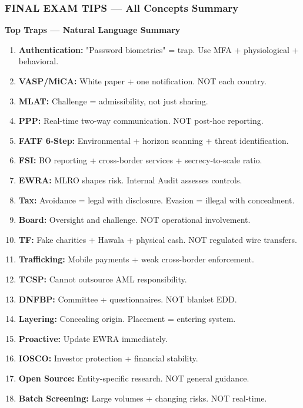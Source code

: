 \documentclass[12pt,aspectratio=169]{beamer}
\renewcommand{\scriptsize}{\fontsize{4.5}{5.5}\selectfont}
\begin{document}
	\begin{frame}
		\frametitle{\fontsize{11}{13}\selectfont \textbf{FINAL EXAM TIPS — All Concepts Summary}}
		\scriptsize
		\begin{block}{\fontsize{7}{9}\selectfont \textbf{Top Traps — Natural Language Summary}}
			\scriptsize
			\begin{enumerate}
				\item \textbf{Authentication:} "Password biometrics" = trap. Use MFA + physiological + behavioral.
				\item \textbf{VASP/MiCA:} White paper + one notification. NOT each country.
				\item \textbf{MLAT:} Challenge = admissibility, not just sharing.
				\item \textbf{PPP:} Real-time two-way communication. NOT post-hoc reporting.
				\item \textbf{FATF 6-Step:} Environmental + horizon scanning + threat identification.
				\item \textbf{FSI:} BO reporting + cross-border services + secrecy-to-scale ratio.
				\item \textbf{EWRA:} MLRO shapes risk. Internal Audit assesses controls.
				\item \textbf{Tax:} Avoidance = legal with disclosure. Evasion = illegal with concealment.
				\item \textbf{Board:} Oversight and challenge. NOT operational involvement.
				\item \textbf{TF:} Fake charities + Hawala + physical cash. NOT regulated wire transfers.
				\item \textbf{Trafficking:} Mobile payments + weak cross-border enforcement.
				\item \textbf{TCSP:} Cannot outsource AML responsibility.
				\item \textbf{DNFBP:} Committee + questionnaires. NOT blanket EDD.
				\item \textbf{Layering:} Concealing origin. Placement = entering system.
				\item \textbf{Proactive:} Update EWRA immediately.
				\item \textbf{IOSCO:} Investor protection + financial stability.
				\item \textbf{Open Source:} Entity-specific research. NOT general guidance.
				\item \textbf{Batch Screening:} Large volumes + changing risks. NOT real-time.

\end{enumerate}
\end{block}
\end{frame}
\end{document}
